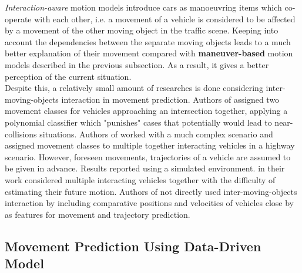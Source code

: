 \textit{Interaction-aware} motion models introduce cars as
manoeuvring items which co-operate with each other, i.e. a movement of a vehicle is considered to be affected by a movement of the other moving object in the traffic scene. Keeping into account the dependencies between the separate moving objects leads to a much better explanation of their movement compared with \textbf{maneuver-based} motion models described in the previous subsection.  As a result, it gives a better perception of the current situation. \\
Despite this, a relatively small amount of researches is done considering inter-moving-objects interaction in movement prediction. Authors of \cite{InterAwareI} assigned two movement classes for vehicles approaching an intersection together, applying a polynomial classifier which "punishes" cases that potentially would lead to near-collisions situations. Authors of \cite{InterAwareII} worked with a much complex scenario and assigned movement classes to multiple together interacting vehicles in a highway scenario. However, foreseen movements, trajectories of a vehicle are assumed to be given in advance. Results reported using a simulated environment. \cite{ClassificationII} in their work considered multiple interacting vehicles together with the difficulty of estimating their future motion.  Authors of \cite{DataDrivenV} not directly used inter-moving-objects interaction by including comparative positions and velocities of vehicles close by as features for movement and trajectory prediction.

\subsection{Movement Prediction Using Data-Driven Model}
\label{subsection:ddr}


